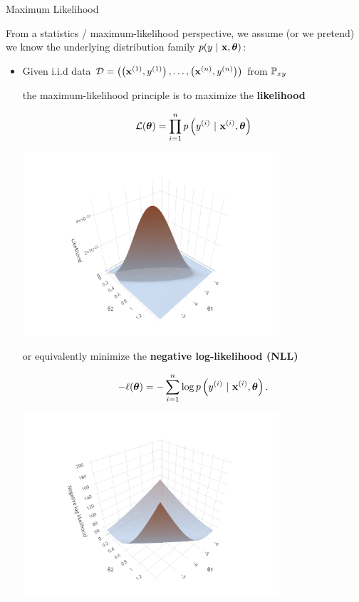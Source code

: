 \documentclass[11pt,compress,t,notes=noshow, xcolor=table]{beamer}
\begin{document}
\begin{vbframe}{Maximum Likelihood}
\framebreak 

From a statistics / maximum-likelihood perspective, we assume (or we pretend) we know the underlying distribution family $p(y~|~\mathbf{x}, \bm{\theta})$:

\begin{itemize}
\item Given i.i.d data $
\mathcal{D} = \left( \left(\mathbf{x}^{(1)}, y^{(1)}\right), \ldots, \left(\mathbf{x}^{(n)}, y^{(n)}\right)\right)
$
 from $\mathbb{P}_{xy}$ 

the maximum-likelihood principle is to maximize the \textbf{likelihood}

\begin{minipage}{0.5\textwidth}
$$ \mathcal{L}(\bm{\theta}) = \prod_{i=1}^n p\left(y^{(i)} ~|~\mathbf{x}^{(i)}, \bm{\theta}\right) $$
\end{minipage}%
\begin{minipage}{0.5\textwidth}
\includegraphics[width = 0.75\textwidth]{figure/log_reg_ml.pdf}
\end{minipage}

or equivalently minimize the \textbf{negative log-likelihood (NLL)}

\begin{minipage}{0.5\textwidth}
$$ -\ell(\bm{\theta}) = -\sum\limits_{i=1}^n \log p\left(y^{(i)} ~|~\mathbf{x}^{(i)}, \bm{\theta}\right). $$
\end{minipage}%
\begin{minipage}{0.5\textwidth}
\includegraphics[width = 0.75\textwidth]{figure/log_reg_erm.pdf}
\end{minipage}
\end{itemize}



\end{vbframe}
\end{document}
